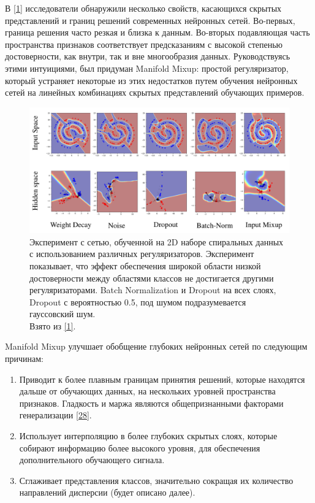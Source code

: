 В \hyperlink{cite.Ver18}{[1]} исследователи обнаружили несколько свойств, касающихся скрытых представлений и границ решений современных нейронных сетей. Во-первых, граница решения часто резкая и близка к данным. Во-вторых подавляющая часть пространства признаков соответствует предсказаниям с высокой степенью достоверности, как внутри, так и вне многообразия данных. Руководствуясь этими интуициями, был придуман Manifold Mixup: простой регуляризатор, который устраняет некоторые из этих недостатков путем обучения нейронных сетей на линейных комбинациях скрытых представлений обучающих примеров.

\begin{figure}
    \centering
    \includegraphics[scale=0.25]{./images/mixup.png}
    \caption{\protect\hypertarget{image10}{Эксперимент с сетью, обученной на 2D наборе спиральных данных с использованием различных регуляризаторов. Эксперимент показывает, что эффект обеспечения широкой области низкой достоверности между областями классов не достигается другими регуляризаторами. Batch Normalization и Dropout на всех слоях, Dropout с вероятностью 0.5, под шумом подразумевается гауссовский шум.
 \\ Взято из \protect\hyperlink{cite.Ver18}{[1]}.}}
\end{figure}

Manifold Mixup улучшает обобщение глубоких нейронных сетей по следующим причинам:
\begin{enumerate}
\item Приводит к более плавным границам принятия решений, которые находятся дальше от обучающих данных, на нескольких уровней пространства признаков. Гладкость и маржа являются общепризнанными факторами генерализации \hyperlink{cite.Pet98}{[28]}.  
\item Использует интерполяцию в более глубоких скрытых слоях, которые собирают информацию более высокого уровня, для обеспечения дополнительного обучающего сигнала.
\item Сглаживает представления классов, значительно сокращая их количество направлений дисперсии (будет описано далее).
\end{enumerate}

